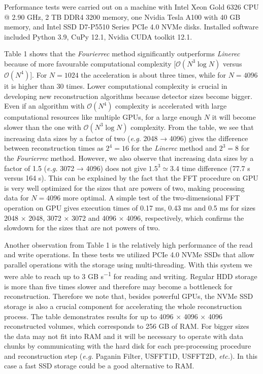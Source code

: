 \documentclass{article}
\begin{document}
Performance tests were carried out on a machine with Intel Xeon Gold 6326 CPU @ 2.90 GHz, 2 TB DDR4 3200 memory, one Nvidia Tesla A100 with 40 GB memory, and Intel SSD D7-P5510 Series PCIe 4.0 NVMe disks. Installed software included Python 3.9, CuPy 12.1, Nvidia CUDA toolkit 12.1.

Table 1 shows that the \emph{Fourierrec} method significantly outperforms \emph{Linerec} because of more favourable computational complexity [$\mathcal{O}(N^3 \log N)$ versus $\mathcal{O}(N^4)$]. For $N = 1024$ the acceleration is about three times, while for $N = 4096$ it is higher than 30 times. Lower computational complexity is crucial in developing new reconstruction algorithms because detector sizes become bigger. Even if an algorithm with $\mathcal{O}(N^4)$ complexity is accelerated with large computational resources like multiple GPUs, for a large enough $N$ it will become slower than the one with $\mathcal{O}(N^3 \log N)$ complexity. From the table, we see that increasing data sizes by a factor of two (\emph{e.g.} 2048 → 4096) gives the difference between reconstruction times as $2^4 = 16$ for the \emph{Linerec} method and $2^3 = 8$ for the \emph{Fourierrec} method. However, we also observe that increasing data sizes by a factor of 1.5 (\emph{e.g.} 3072 → 4096) does not give $1.5^3 \simeq 3.4$ time difference (77.7 s versus 164 s). This can be explained by the fact that the FFT procedure on GPU is very well optimized for the sizes that are powers of two, making processing data for $N = 4096$ more optimal. A simple test of the two-dimensional FFT operation on GPU gives execution times of 0.17 ms, 0.43 ms and 0.5 ms for sizes 2048 × 2048, 3072 × 3072 and 4096 × 4096, respectively, which confirms the slowdown for the sizes that are not powers of two.

Another observation from Table 1 is the relatively high performance of the read and write operations. In these tests we utilized PCIe 4.0 NVMe SSDs that allow parallel operations with the storage using multi-threading. With this system we were able to reach up to 3 GB s\textsuperscript{−1} for reading and writing. Regular HDD storage is more than five times slower and therefore may become a bottleneck for reconstruction. Therefore we note that, besides powerful GPUs, the NVMe SSD storage is also a crucial component for accelerating the whole reconstruction process. The table demonstrates results for up to 4096 × 4096 × 4096 reconstructed volumes, which corresponds to 256 GB of RAM. For bigger sizes the data may not fit into RAM and it will be necessary to operate with data chunks by communicating with the hard disk for each pre-processing procedure and reconstruction step (\emph{e.g.} Paganin Filter, USFFT1D, USFFT2D, \emph{etc.}). In this case a fast SSD storage could be a good alternative to RAM.
\end{document}
